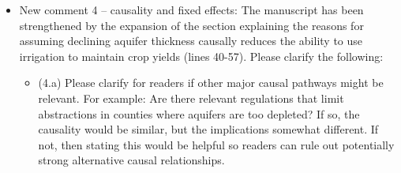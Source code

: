 \documentclass[
]{article}
\begin{document}
\begin{itemize}
\item New comment 4 – causality and fixed effects: The manuscript has been strengthened by the expansion of the section explaining the reasons for assuming declining aquifer thickness causally reduces the ability to use irrigation to maintain crop yields (lines 40-57). Please clarify the following:

  \begin{itemize}
  \item (4.a) Please clarify for readers if other major causal pathways might be relevant. For example: Are there relevant regulations that limit abstractions in counties where aquifers are too depleted? If so, the causality would be similar, but the implications somewhat different. If not, then stating this would be helpful so readers can rule out potentially strong alternative causal relationships.


\end{itemize}
\end{itemize}
\end{document}

